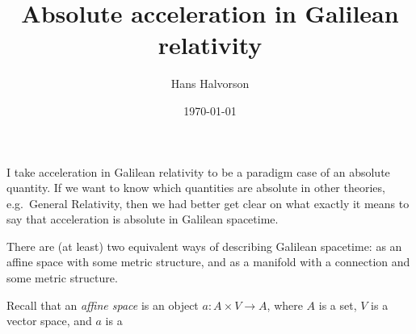 \documentclass[12pt]{article}
\title{Absolute acceleration in Galilean relativity}
\author{Hans Halvorson}
\date{\today}
\begin{document}
I take acceleration in Galilean relativity to be a paradigm case of an
absolute quantity. If we want to know which quantities are absolute in
other theories, e.g.\ General Relativity, then we had better get clear
on what exactly it means to say that acceleration is absolute in
Galilean spacetime.

There are (at least) two equivalent ways of describing Galilean
spacetime: as an affine space with some metric structure, and as a
manifold with a connection and some metric structure.

Recall that an \emph{affine space} is an object $a:A\times V\to A$,
where $A$ is a set, $V$ is a vector space, and $a$ is a
\end{document}

